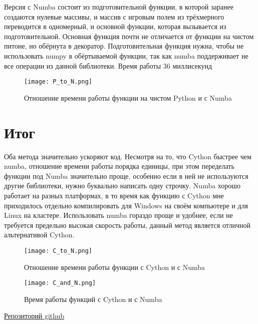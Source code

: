 \documentclass[a4paper,12pt]{article}
\begin{document}
Версия с Numba состоит из подготовительной функции, в которой заранее создаются нулевые массивы, и массив с игровым полем из трёхмерного переводится в одномерный, и основной функции, которая вызывается из подготовительной. Основная функция почти не отличается от функции на чистом питоне, но обёрнута в декоратор. Подготовительная функция нужна, чтобы не использовать numpy в обёртываемой функции, так как numba поддерживает не все операции из данной библиотеки. Время работы 36 миллисекунд

\begin{figure}[H]
	 \centering
    	\texttt{[image: P\_to\_N.png]}
    	\caption{Отношение времени работы функции на чистом Python и с Numba}
	\label{fig:Fcgraph}
\end{figure}

\section{Итог}




Оба метода значительно ускоряют код. Несмотря на то, что Cython быстрее чем numba, отношение времени работы порядка единицы, при этом переделать функции под Numba значительно проще, особенно если в ней не используются другие библиотеки, нужно буквально написать одну строчку. Numba хорошо работает на разных платформах, в то время как функцию с Cython мне приходилось отдельно компилировать для Windows на своём компьютере и  для Linux на кластере. Использовать numba гораздо проще и удобнее, если не требуется предельно высокая скорость работы, данный метод является отличной альтернативой Cython. 

\begin{figure}[H]
	 \centering
    	\texttt{[image: C\_to\_N.png]}
    	\caption{Отношение времени работы функции с Cython и с Numba}
	\label{fig:Fcgraph}
\end{figure}

\begin{figure}[H]
	 \centering
    	\texttt{[image: C\_and\_N.png]}
    	\caption{ Время работы функций с Cython и с Numba}
	\label{fig:Fcgraph}
\end{figure}

\begin{thebibliography}{1}

\label{githab}
\href{https://github.com/MoskalenkoRomanBorisovich/Spatial-Distribution-Evolutionary-Game}{Репозиторий github}

\end{thebibliography}
\end{document}
